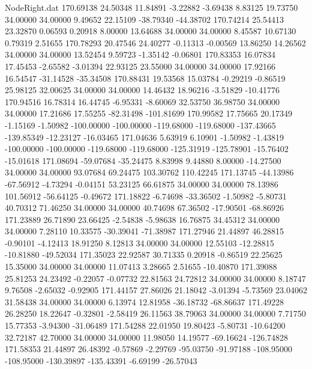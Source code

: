 \begin{filecontents}{NodeRight.dat}
 170.69138   24.50348   11.84891    -3.22882   -3.69438    8.83125   19.73750   34.00000   34.00000    9.49652   22.15109  -38.79340  -44.38702
 170.74214   25.54413   23.32870     0.06593    0.20918    8.00000   13.64688   34.00000   34.00000    8.45587   10.67130    0.79319    2.51655
 170.78293   20.47546   24.40277    -0.11313   -0.00569   13.86250   14.26562   34.00000   34.00000   13.52454    9.59723   -1.35142   -0.06801
 170.83353   16.07834   17.45453    -2.65582   -3.01394   22.93125   23.55000   34.00000   34.00000   17.92166   16.54547  -31.14528  -35.34508
 170.88431   19.53568   15.03784    -0.29219   -0.86519   25.98125   32.00625   34.00000   34.00000   14.46432   18.96216   -3.51829  -10.41776
 170.94516   16.78314   16.44745    -6.95331   -8.60069   32.53750   36.98750   34.00000   34.00000   17.21686   17.55255  -82.31498 -101.81699
 170.99582   17.75665   20.17349    -1.15169   -1.50982 -100.00000 -100.00000 -119.68000 -119.68000 -137.43665 -139.85349  -12.23127  -16.03465
 171.04636    5.63919    6.10901    -1.50982   -1.43819 -100.00000 -100.00000 -119.68000 -119.68000 -125.31919 -125.78901  -15.76402  -15.01618
 171.08694  -59.07684  -35.24475     8.83998    9.44880    8.00000  -14.27500   34.00000   34.00000   93.07684   69.24475  103.30762  110.42245
 171.13745  -44.13986  -67.56912    -4.73294   -0.04151   53.23125   66.61875   34.00000   34.00000   78.13986  101.56912  -56.64125   -0.49672
 171.18822   -6.74698  -33.36502    -1.50982   -5.80731   40.70312   71.46250   34.00000   34.00000   40.74698   67.36502  -17.90501  -68.86926
 171.23889   26.71890   23.66425    -2.54838   -5.98638   16.76875   34.45312   34.00000   34.00000    7.28110   10.33575  -30.39041  -71.38987
 171.27946   21.44897   46.28815    -0.90101   -4.12413   18.91250    8.12813   34.00000   34.00000   12.55103  -12.28815  -10.81880  -49.52034
 171.35023   22.92587   30.71335     0.20918   -0.86519   22.25625   15.35000   34.00000   34.00000   11.07413    3.28665    2.51655  -10.40870
 171.39088   25.81253   24.23492    -0.22057   -0.07732   22.81563   24.72812   34.00000   34.00000    8.18747    9.76508   -2.65032   -0.92905
 171.44157   27.86026   21.18042    -3.01394   -5.73569   23.04062   31.58438   34.00000   34.00000    6.13974   12.81958  -36.18732  -68.86637
 171.49228   26.28250   18.22647    -0.32801   -2.58419   26.11563   38.79063   34.00000   34.00000    7.71750   15.77353   -3.94300  -31.06489
 171.54288   22.01950   19.80423    -5.80731  -10.64200   32.72187   42.70000   34.00000   34.00000   11.98050   14.19577  -69.16624 -126.74828
 171.58353   21.44897   26.48392    -0.57869   -2.29769  -95.03750  -91.97188 -108.95000 -108.95000 -130.39897 -135.43391   -6.69199  -26.57043

\end{filecontents}
